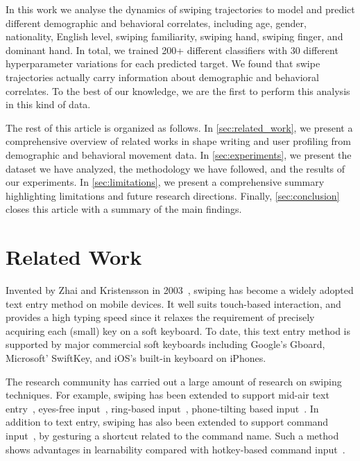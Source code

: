 \documentclass[sn-mathphys, pdflatex]{sn-jnl}
\begin{document}
In this work we analyse the dynamics of swiping trajectories to model and predict different demographic and behavioral correlates,
including age, gender, nationality, English level, swiping familiarity, swiping hand, swiping finger, and dominant hand.
In total, we trained 200+ different classifiers with 30 different hyperparameter variations for each predicted target.
We found that swipe trajectories actually carry information about demographic and behavioral correlates.
To the best of our knowledge, we are the first to perform this analysis in this kind of data.

The rest of this article is organized as follows. In \autoref{sec:related_work}, we present a comprehensive overview of related works in shape writing and user profiling from demographic and behavioral movement data. In \autoref{sec:experiments}, we present the dataset we have analyzed, the methodology we have followed, and the results of our experiments. In \autoref{sec:limitations}, we present a comprehensive summary highlighting limitations and future research directions. Finally, \autoref{sec:conclusion} closes this article with a summary of the main findings.

\section{Related Work}
\label{sec:related_work}

Invented by Zhai and Kristensson in 2003~\cite{Zhai03},
swiping has become a widely adopted text entry method on mobile devices.
It well suits touch-based interaction, and provides a high typing speed
since it relaxes the requirement of precisely acquiring each (small) key on a soft keyboard.
To date, this text entry method is supported by major commercial soft keyboards
including Google's Gboard, Microsoft' SwiftKey, and iOS's built-in keyboard on iPhones.

The research community has carried out a large amount of research on swiping techniques.
For example, swiping has been extended to support mid-air text entry~\cite{Markussen:2014:VMW}, eyes-free input~\cite{zhu2019sfree}, ring-based input~\cite{gupta2019rotoswype}, phone-tilting based input~\cite{yeo2017investigating}.
In addition to text entry, swiping has also been extended to support command input~\cite{kristensson2007command, alvina2017commandboard, cui2019hotstrokes},
by gesturing a shortcut related to the command name.
Such a method shows advantages in learnability compared with hotkey-based command input~\cite{cui2019hotstrokes}.
\end{document}
